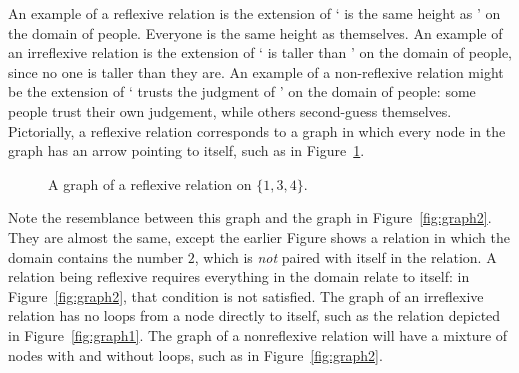 An example of a reflexive relation is the extension of ` is the same height as ' on the domain of people. Everyone is the same height as themselves. An example of an irreflexive relation is the extension of ` is taller than ' on the domain of people, since no one is taller than they are. An example of a non-reflexive relation might be the extension of ` trusts the judgment of ' on the domain of people: some people trust their own judgement, while others second-guess themselves. Pictorially, a reflexive relation corresponds to a graph in which every node in the graph has an arrow pointing to itself, such as in Figure~\ref{fig:reflex}. 
\begin{figure}
\caption{A graph of a reflexive relation on $\{1, 3, 4\}$.\label{fig:reflex}}
\end{figure} Note the resemblance between this graph and the graph in Figure~\ref{fig:graph2}. They are almost the same, except the earlier Figure shows a relation in which the domain contains the number $2$, which is \emph{not} paired with itself in the relation. A relation being reflexive requires everything in the domain relate to itself: in Figure~\ref{fig:graph2}, that condition is not satisfied.  The graph of an irreflexive relation has no loops from a node directly to itself, such as the relation depicted in Figure~\ref{fig:graph1}. The graph of a nonreflexive relation will have a mixture of nodes with and without loops, such as in Figure~\ref{fig:graph2}.

